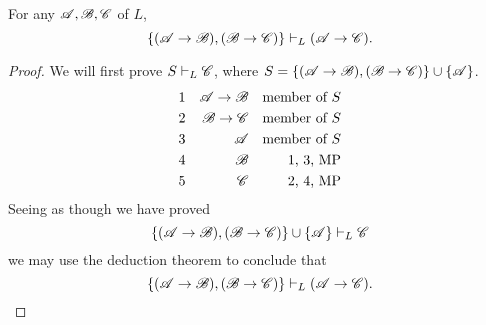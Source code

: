 \begin{corollary}
  For any \wfs{} \(\mathscr{A}, \mathscr{B}, \mathscr{C}\) of \(L\),
  \[\{(\mathscr{A} \rightarrow \mathscr{B}), (\mathscr{B} \rightarrow \mathscr{C})\} \vdash_{L} (\mathscr{A} \rightarrow \mathscr{C}).\]

  \begin{proof}
    We will first prove \(S \vdash_{L} \mathscr{C}\), where \(S = \{(\mathscr{A} \rightarrow \mathscr{B}), (\mathscr{B} \rightarrow \mathscr{C})\} \cup \{\mathscr{A}\}\).
    \begin{align*}
      \text{1}&&
      \mathscr{A} \rightarrow \mathscr{B}&&
      \text{member of \(S\)}\\
      \text{2}&&
      \mathscr{B} \rightarrow \mathscr{C}&&
      \text{member of \(S\)}\\
      \text{3}&&
      \mathscr{A}&&
      \text{member of \(S\)}\\
      \text{4}&&
      \mathscr{B}&&
      \text{1, 3, MP}\\
      \text{5}&&
      \mathscr{C}&&
      \text{2, 4, MP}
    \end{align*}
    Seeing as though we have proved
      \[\{(\mathscr{A} \rightarrow \mathscr{B}), (\mathscr{B} \rightarrow \mathscr{C})\} \cup \{\mathscr{A}\} \vdash_{L} \mathscr{C}\]
    we may use the deduction theorem to conclude that
      \[\{(\mathscr{A} \rightarrow \mathscr{B}), (\mathscr{B} \rightarrow \mathscr{C})\} \vdash_{L} (\mathscr{A} \rightarrow \mathscr{C}).\]
  \end{proof}
\end{corollary}

